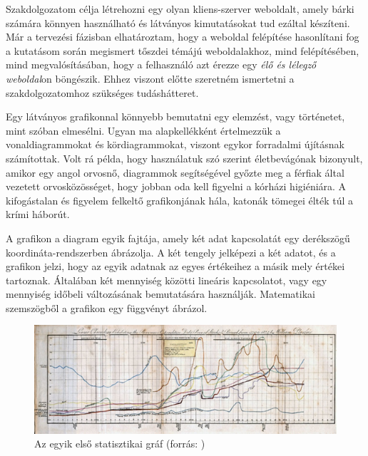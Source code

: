 
Szakdolgozatom célja létrehozni egy olyan kliens-szerver weboldalt, amely bárki számára könnyen használható és látványos kimutatásokat tud ezáltal készíteni. Már a tervezési fázisban elhatároztam, hogy a weboldal felépítése hasonlítani fog a kutatásom során megismert tőszdei témájú weboldalakhoz, mind felépítésében, mind megvalósításában, hogy a felhasználó azt érezze egy\textit{ élő és lélegző weboldal}on böngészik. Ehhez viszont előtte szeretném ismertetni a szakdolgozatomhoz szükséges tudáshátteret.


Egy látványos grafikonnal könnyebb bemutatni egy elemzést, vagy történetet, mint szóban elmesélni. Ugyan ma alapkellékként értelmezzük a vonaldiagrammokat és kördiagrammokat, viszont egykor forradalmi újításnak számítottak. Volt rá példa, hogy használatuk szó szerint életbevágónak bizonyult, amikor egy angol orvosnő, diagrammok segítségével győzte meg a férfiak által vezetett orvosközösséget, hogy jobban oda kell figyelni a kórházi higiéniára. A kifogástalan és figyelem felkeltő grafikonjának hála, katonák tömegei élték túl a krími háborút.  \cite{portfolio}

	A grafikon a diagram egyik fajtája, amely két adat kapcsolatát egy derékszögű koordináta-rendszerben ábrázolja. A két tengely jelképezi a két adatot, és a grafikon jelzi, hogy az egyik adatnak az egyes értékeihez a másik mely értékei tartoznak. Általában két mennyiség közötti lineáris kapcsolatot, vagy egy mennyiség időbeli változásának bemutatására használják. Matematikai szemszögből a grafikon egy függvényt ábrázol. \cite{wikiMatek}

\begin{figure}[h]
\centering
\includegraphics[scale=1]{images/historyOfGraphs}
\caption{Az egyik első statisztikai gráf (forrás: \cite{oldGraph})}
\end{figure}


